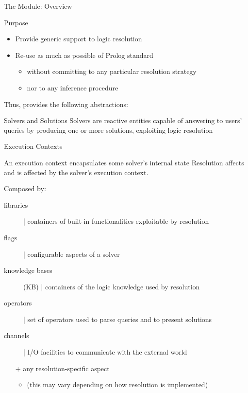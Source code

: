 \documentclass[handout]{beamer}
\begin{document}
\begin{frame}[allowframebreaks]{The  Module: Overview}

    \begin{block}{Purpose}
        \begin{itemize}
            \item Provide generic support to logic resolution
            \item Re-use as much as possible of Prolog standard 
            \begin{itemize}
                \item without committing to any particular resolution strategy
                \item nor to any inference procedure
            \end{itemize}
        \end{itemize}
    \end{block}

    \framebreak

    Thus,  provides the following abstractions:

    \begin{block}{Solvers and Solutions}\centering
        Solvers are reactive entities capable of answering to users' queries by producing one or more solutions, exploiting logic resolution
    \end{block}

    \begin{block}{Execution Contexts}
        \begin{center}
            An execution context encapsulates some solver's internal state
            Resolution affects and is affected by the solver's execution context.
        \end{center}

        \small
        Composed by:
        \begin{description}
            \item[libraries] | containers of built-in functionalities exploitable by resolution
            \item[flags] | configurable aspects of a solver
            \item[knowledge bases] (KB) | containers of the logic knowledge used by resolution
            \item[operators] | set of operators used to parse queries and to present solutions
            \item[channels] | I/O facilities to communicate with the external world
        \end{description}
        \begin{itemize}\small
            \item[+] any resolution-specific aspect
            \begin{itemize}\scriptsize
                \item (this may vary depending on how resolution is implemented)
            \end{itemize} 
        \end{itemize}
    \end{block}


\end{frame}
\end{document}
